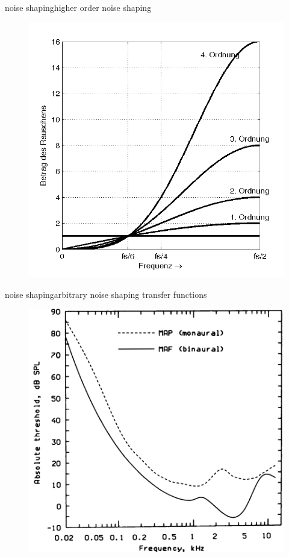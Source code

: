 	\begin{frame}{noise shaping}{higher order noise shaping}
		\begin{figure}
			\centering
				\includegraphics[scale=0.6]{Graph/noiseshaping}
		\end{figure}
	\end{frame}
	
	\begin{frame}{noise shaping}{arbitrary noise shaping transfer functions}
		\begin{figure}
			\centering
				\includegraphics[scale=0.3]{Graph/ATH}
		\end{figure}
	\end{frame}
	
